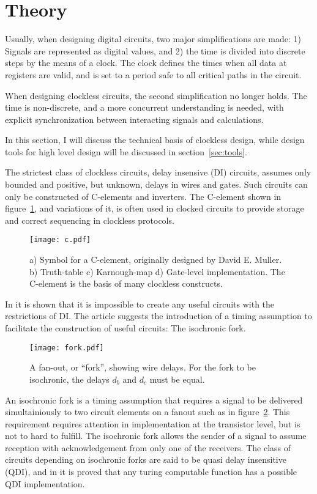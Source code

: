 \section{Theory}

Usually, when designing digital circuits, two major simplifications
are made: 1) Signals are represented as digital values, and 2) the
time is divided into discrete steps by the means of a clock. The clock
defines the times when all data at registers are valid, and is set to
a period safe to all critical paths in the circuit.

When designing clockless circuits, the second simplification no longer
holds. The time is non-discrete, and a more concurrent understanding
is needed, with explicit synchronization between interacting signals
and calculations.

In this section, I will discuss the technical basis of clockless
design, while design tools for high level design will be discussed in
section~\ref{sec:tools}.

The strictest class of clockless circuits, delay insensive (DI)
circuits, assumes only bounded and positive, but unknown, delays in
wires and gates. Such circuits can only be constructed of C-elements
and inverters. The C-element shown in figure~\ref{fig:c}, and
variations of it, is often used in clocked circuits to provide storage
and correct sequencing in clockless protocols.

\begin{figure}[htbp]
  \centering
  \texttt{[image: c.pdf]}
  \caption{a) Symbol for a C-element, originally designed by David
    E. Muller. b) Truth-table c) Karnough-map d) Gate-level
    implementation. The C-element is the basis of many clockless
    constructs.}
  \label{fig:c}
\end{figure}

In \cite{dilimit} it is shown that it is impossible to create any
useful circuits with the restrictions of DI. The article suggests the
introduction of a timing assumption to facilitate the construction of
useful circuits: The isochronic fork.

\begin{figure}[htbp]
  \centering
  \texttt{[image: fork.pdf]}
  \caption{A fan-out, or ``fork'', showing wire delays. For the
    fork to be isochronic, the delays $d_b$ and $d_c$ must be equal.}
  \label{fig:fork}
\end{figure}

An isochronic fork is a timing assumption that requires a signal to be
delivered simultainiously to two circuit elements on a fanout such as
in figure~\ref{fig:fork}. This requirement requires attention in
implementation at the transistor level, but is not to hard to
fulfill. The isochronic fork allows the sender of a signal to assume
reception with acknowledgement from only one of the receivers. The
class of circuits depending on isochronic forks are said to be quasi
delay insensitive (QDI), and in \cite{turing} it is proved that any
turing computable function has a possible QDI implementation.

